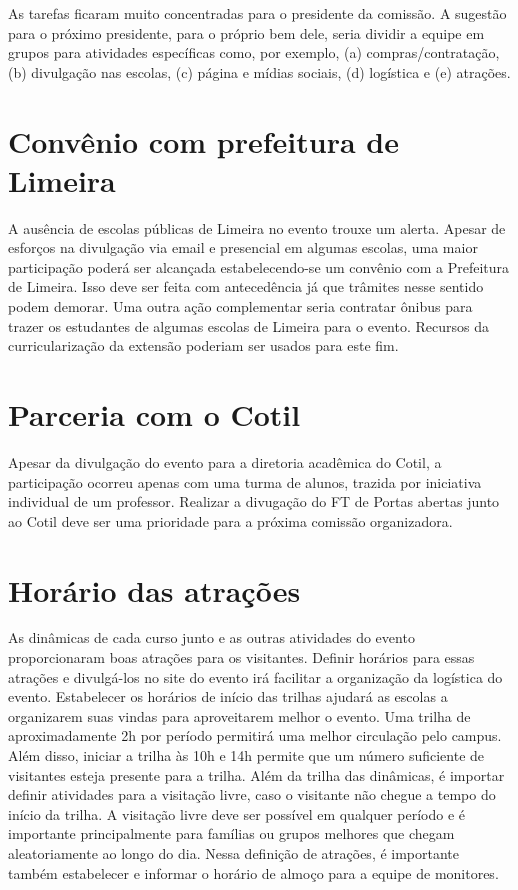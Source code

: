\documentclass[
  letterpaper,
  DIV=11,
  numbers=noendperiod]{scrreprt}
\begin{document}
As tarefas ficaram muito concentradas para o presidente da comissão. A
sugestão para o próximo presidente, para o próprio bem dele, seria
dividir a equipe em grupos para atividades específicas como, por
exemplo, (a) compras/contratação, (b) divulgação nas escolas, (c) página
e mídias sociais, (d) logística e (e) atrações.

\section{Convênio com prefeitura de
Limeira}\label{convuxeanio-com-prefeitura-de-limeira}

A ausência de escolas públicas de Limeira no evento trouxe um alerta.
Apesar de esforços na divulgação via email e presencial em algumas
escolas, uma maior participação poderá ser alcançada estabelecendo-se um
convênio com a Prefeitura de Limeira. Isso deve ser feita com
antecedência já que trâmites nesse sentido podem demorar. Uma outra ação
complementar seria contratar ônibus para trazer os estudantes de algumas
escolas de Limeira para o evento. Recursos da curricularização da
extensão poderiam ser usados para este fim.

\section{Parceria com o Cotil}\label{parceria-com-o-cotil}

Apesar da divulgação do evento para a diretoria acadêmica do Cotil, a
participação ocorreu apenas com uma turma de alunos, trazida por
iniciativa individual de um professor. Realizar a divugação do FT de
Portas abertas junto ao Cotil deve ser uma prioridade para a próxima
comissão organizadora.

\section{Horário das atrações}\label{horuxe1rio-das-atrauxe7uxf5es}

As dinâmicas de cada curso junto e as outras atividades do evento
proporcionaram boas atrações para os visitantes. Definir horários para
essas atrações e divulgá-los no site do evento irá facilitar a
organização da logística do evento. Estabelecer os horários de início
das trilhas ajudará as escolas a organizarem suas vindas para
aproveitarem melhor o evento. Uma trilha de aproximadamente 2h por
período permitirá uma melhor circulação pelo campus. Além disso, iniciar
a trilha às 10h e 14h permite que um número suficiente de visitantes
esteja presente para a trilha. Além da trilha das dinâmicas, é importar
definir atividades para a visitação livre, caso o visitante não chegue a
tempo do início da trilha. A visitação livre deve ser possível em
qualquer período e é importante principalmente para famílias ou grupos
melhores que chegam aleatoriamente ao longo do dia. Nessa definição de
atrações, é importante também estabelecer e informar o horário de almoço
para a equipe de monitores.
\end{document}
